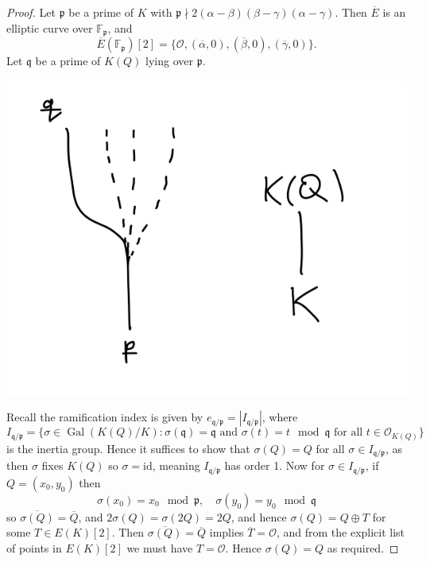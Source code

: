 \documentclass[a4paper]{article}
\theoremstyle{definition}
\DeclareMathOperator{\Gal}{Gal}
\newcommand{\id}{\mathrm{id}}
\newcommand{\p}{\mathfrak{p}}
\newcommand{\q}{\mathfrak{q}}
\renewcommand{\O}{\mathcal{O}}
\newcommand{\F}{\mathbb{F}}
\begin{document}
\begin{proof}
    Let $\p$ be a prime of $K$ with
    $\p\nmid 2(\alpha-\beta)(\beta-\gamma)(\alpha-\gamma)$. Then $\overline E$
    is an elliptic curve over $\F_\p$, and
    \begin{equation*}
        \overline E(\F_\p)[2]
            = \{\O,(\overline\alpha,0),(\overline\beta,0),(\overline\gamma,0)\}.
    \end{equation*}
    Let $\q$ be a prime of $K(Q)$ lying over $\p$.
    \begin{center}
        \includegraphics[scale=0.25]{lyingover}
    \end{center}
    Recall the ramification index is given by $e_{\q/\p}=|I_{\q/\p}|$, where
    \begin{equation*}
        I_{\q/\p} = \{\sigma\in\Gal(K(Q)/K)
            :\text{$\sigma(\q)=\q$ and $\sigma(t)=t\mod\q$ for all
            $t\in\O_{K(Q)}$}\}
    \end{equation*}
    is the inertia group. Hence it suffices to show that $\sigma(Q)=Q$ for all
    $\sigma\in I_{\q/\p}$, as then $\sigma$ fixes $K(Q)$ so $\sigma=\id$,
    meaning $I_{\q/\p}$ has order 1. Now for $\sigma\in I_{\q/\p}$, if
    $Q=(x_0,y_0)$ then
    \begin{equation*}
        \sigma(x_0)=x_0\mod\p,\quad\sigma(y_0)=y_0\mod\q
    \end{equation*}
    so $\overline{\sigma(Q)}=\overline Q$, and $2\sigma(Q)=\sigma(2Q)=2Q$, and
    hence $\sigma(Q)=Q\oplus T$ for some $T\in E(K)[2]$. Then
    $\overline{\sigma(Q)}=\overline Q$ implies $\overline T=\O$, and from the
    explicit list of points in $E(K)[2]$ we must have $T=\O$. Hence
    $\sigma(Q)=Q$ as required.
\end{proof}
\end{document}
